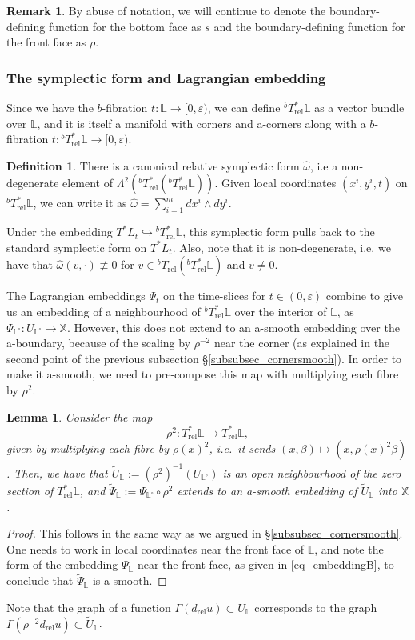 \documentclass[10pt, a4paper]{article}
\theoremstyle{plain}%
\newtheorem{lem}[theorem]{Lemma}
\theoremstyle{definition}
\newtheorem{defn}[theorem]{Definition}
\newtheorem{rem}[theorem]{Remark}
\numberwithin{figure}{section}
\numberwithin{equation}{section}
\newcommand{\bL}{\mathbb{L}}
\newcommand{\bX}{\mathbb{X}}
\newcommand{\rt}{\rightarrow}
\newcommand{\ep}{\varepsilon}
\newcommand{\tpsil}{\tilde{\Psi}_\bL}
\newcommand{\rel}{\mathrm{rel}}
\begin{document}
\begin{rem}
	By abuse of notation, we will continue to denote the boundary-defining function for the bottom face as $s$ and the boundary-defining function for the front face as $\rho$.
\end{rem}

\subsubsection{The symplectic form and Lagrangian embedding}

Since we have the $b$-fibration $t:\bL\rt [0,\ep)$, we can define $^bT^*_\mathrm{rel}\bL$ as a vector bundle over $\bL$, and it is itself a manifold with corners and a-corners along with a $b$-fibration $t: {^bT^*_\rel\bL\rt[0,\ep)}$. 
\begin{defn}There is a canonical relative symplectic form $\hat{\omega}$, i.e a non-degenerate element of $\Lambda^2(^bT_\mathrm{rel}^*(^bT^*_\mathrm{rel}\bL))$. Given local coordinates $(x^i,y^i,t)$ on $^bT^*_\mathrm{rel}\bL$, we can write it as $\hat{\omega}=\sum_{i=1}^mdx^i\wedge dy^i$.
\end{defn}

Under the embedding $T^*L_t\hookrightarrow {^bT^*_\mathrm{rel}}\bL$, this symplectic form pulls back to the standard symplectic form on $T^*L_t$. Also, note that it is non-degenerate, i.e$.$ we have that $\hat{\omega}(v,\cdot) \not \equiv 0$ for $v\in {^bT_\mathrm{rel}}({^bT^*_\mathrm{rel}\bL})$ and $v\not = 0$.

The Lagrangian embeddings $\Psi_t$ on the time-slices for $t\in(0,\ep)$ combine to give us an embedding of a neighbourhood of $^bT^*_\mathrm{rel}\bL$ over the interior of $\bL$, as $\Psi_{\bL^\circ}: U_{\bL^\circ}\rt\bX$. However, this does not extend to an a-smooth embedding over the a-boundary, because of the scaling by $\rho^{-2}$ near the corner (as explained in the second point of the previous subsection \S \eqref{subsubsec_cornersmooth}). In order to make it a-smooth, we need to pre-compose this map with multiplying each fibre by $\rho^{2}$. 

\begin{lem}
	Consider the map \[
	\rho^{2} : T^*_\mathrm{rel}\bL \rt T^*_\mathrm{rel}\bL, 
	\]
	given by multiplying each fibre by $\rho(x)^{2}$, i.e.\ it sends $(x,\beta)\mapsto(x,\rho(x)^2\beta)$. Then, we have that $\tilde{U}_\bL:=\overline{(\rho^{2})^{-1}(U_{\bL^\circ})}$ is an open neighbourhood of the zero section of $T^*_\mathrm{rel}\bL$, and $\tilde{\Psi}_\bL:= \Psi_{\bL^\circ}\circ \rho^{2}$ extends to an a-smooth embedding of $\tilde{U}_\bL$ into $\bX$.
\end{lem}
\begin{proof}
	This follows in the same way as we argued in \S \ref{subsubsec_cornersmooth}. One needs to work in local coordinates near the front face of $\bL$, and note the form of the embedding $\Psi_\bL$ near the front face, as given in \eqref{eq_embeddingB}, to conclude that $\tpsil$ is a-smooth.
\end{proof}
Note that the graph of a function $\Gamma(d_\mathrm{rel}u)\subset U_\bL$ corresponds to the graph $\Gamma(\rho^{-2}d_\mathrm{rel}u)\subset \widetilde{U}_\bL$.
\end{document}
